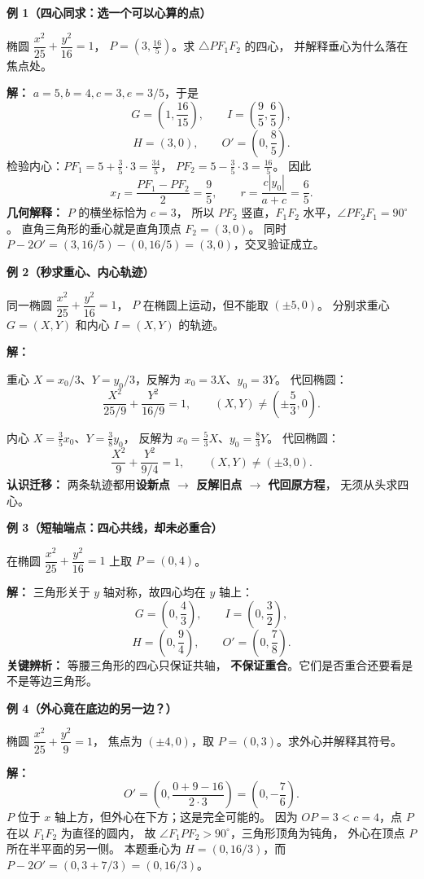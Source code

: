 \begin{examplebox}
\textbf{例 1（四心同求：选一个可以心算的点）}

椭圆 $\dfrac{x^2}{25}+\dfrac{y^2}{16}=1$，
$P=(3,\tfrac{16}{5})$。求 $\triangle PF_1F_2$ 的四心，
并解释垂心为什么落在焦点处。

\textbf{解：} $a=5,b=4,c=3,e=3/5$，于是
\[
 G=\left(1,\frac{16}{15}\right),\qquad
 I=\left(\frac95,\frac65\right),
\]
\[
 H=(3,0),\qquad O'=\left(0,\frac85\right).
\]
检验内心：$PF_1=5+\frac35\cdot3=\frac{34}{5}$，
$PF_2=5-\frac35\cdot3=\frac{16}{5}$。
因此
\[
 x_I=\frac{PF_1-PF_2}{2}=\frac95,\qquad
 r=\frac{c|y_0|}{a+c}=\frac65.
\]
\textbf{几何解释：} $P$ 的横坐标恰为 $c=3$，
所以 $PF_2$ 竖直，$F_1F_2$ 水平，$\angle PF_2F_1=90^\circ$。
直角三角形的垂心就是直角顶点 $F_2=(3,0)$。
同时 $P-2O'=(3,16/5)-(0,16/5)=(3,0)$，交叉验证成立。

\tcbline
\textbf{例 2（秒求重心、内心轨迹）}

同一椭圆 $\dfrac{x^2}{25}+\dfrac{y^2}{16}=1$，
$P$ 在椭圆上运动，但不能取 $(\pm5,0)$。
分别求重心 $G=(X,Y)$ 和内心 $I=(X,Y)$ 的轨迹。

\textbf{解：}

重心 $X=x_0/3$、$Y=y_0/3$，反解为 $x_0=3X$、$y_0=3Y$。
代回椭圆：
\[
 \boxed{\frac{X^2}{25/9}+\frac{Y^2}{16/9}=1},
 \qquad (X,Y)\ne\left(\pm\frac53,0\right).
\]

内心 $X=\frac35x_0$、$Y=\frac38y_0$，
反解为 $x_0=\frac53X$、$y_0=\frac83Y$。
代回椭圆：
\[
 \boxed{\frac{X^2}{9}+\frac{Y^2}{9/4}=1},
 \qquad (X,Y)\ne(\pm3,0).
\]
\textbf{认识迁移：} 两条轨迹都用\textbf{设新点 $\to$ 反解旧点 $\to$ 代回原方程}，
无须从头求四心。

\tcbline
\textbf{例 3（短轴端点：四心共线，却未必重合）}

在椭圆 $\dfrac{x^2}{25}+\dfrac{y^2}{16}=1$ 上取 $P=(0,4)$。

\textbf{解：} 三角形关于 $y$ 轴对称，故四心均在 $y$ 轴上：
\[
 G=\left(0,\frac43\right),\qquad
 I=\left(0,\frac32\right),
\]
\[
 H=\left(0,\frac94\right),\qquad
 O'=\left(0,\frac78\right).
\]
\textbf{关键辨析：} 等腰三角形的四心只保证共轴，
\textbf{不保证重合}。它们是否重合还要看是不是等边三角形。

\tcbline
\textbf{例 4（外心竟在底边的另一边？）}

椭圆 $\dfrac{x^2}{25}+\dfrac{y^2}{9}=1$，
焦点为 $(\pm4,0)$，取 $P=(0,3)$。求外心并解释其符号。

\textbf{解：}
\[
 O'=\left(0,\frac{0+9-16}{2\cdot3}\right)
 =\boxed{\left(0,-\frac76\right)}.
\]
$P$ 位于 $x$ 轴上方，但外心在下方；这是完全可能的。
因为 $OP=3<c=4$，点 $P$ 在以 $F_1F_2$ 为直径的圆内，
故 $\angle F_1PF_2>90^\circ$，三角形顶角为钝角，
外心在顶点 $P$ 所在半平面的另一侧。
本题垂心为 $H=(0,16/3)$，而 $P-2O'=(0,3+7/3)=(0,16/3)$。


\end{examplebox}
